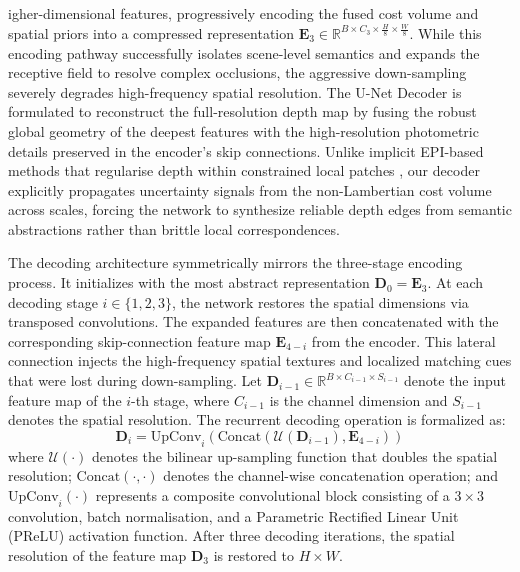 \documentclass[lettersize,journal]{IEEEtran}
\begin{document}
igher-dimensional features, progressively encoding the fused cost volume and spatial priors into a compressed representation $\mathbf{E}_3 \in \mathbb{R}^{B \times C_3 \times \frac{H}{8} \times \frac{W}{8}}$. While this encoding pathway successfully isolates scene-level semantics and expands the receptive field to resolve complex occlusions, the aggressive down-sampling severely degrades high-frequency spatial resolution. The U-Net Decoder is formulated to reconstruct the full-resolution depth map by fusing the robust global geometry of the deepest features with the high-resolution photometric details preserved in the encoder's skip connections. Unlike implicit EPI-based methods that regularise depth within constrained local patches \cite{heber2018}, our decoder explicitly propagates uncertainty signals from the non-Lambertian cost volume across scales, forcing the network to synthesize reliable depth edges from semantic abstractions rather than brittle local correspondences.

The decoding architecture symmetrically mirrors the three-stage encoding process. It initializes with the most abstract representation $\mathbf{D}_0 = \mathbf{E}_3$. At each decoding stage $i \in \{1, 2, 3\}$, the network restores the spatial dimensions via transposed convolutions. The expanded features are then concatenated with the corresponding skip-connection feature map $\mathbf{E}_{4-i}$ from the encoder. This lateral connection injects the high-frequency spatial textures and localized matching cues that were lost during down-sampling. Let $\mathbf{D}_{i-1} \in \mathbb{R}^{B \times C_{i-1} \times S_{i-1}}$ denote the input feature map of the $i$-th stage, where $C_{i-1}$ is the channel dimension and $S_{i-1}$ denotes the spatial resolution. The recurrent decoding operation is formalized as:
\begin{equation}
\mathbf{D}_i = \text{UpConv}_i \left( \text{Concat} \left( \mathcal{U}(\mathbf{D}_{i-1}), \mathbf{E}_{4-i} \right) \right)
\end{equation}
where $\mathcal{U}(\cdot)$ denotes the bilinear up-sampling function that doubles the spatial resolution; $\text{Concat}(\cdot, \cdot)$ denotes the channel-wise concatenation operation; and $\text{UpConv}_i(\cdot)$ represents a composite convolutional block consisting of a $3 \times 3$ convolution, batch normalisation, and a Parametric Rectified Linear Unit (PReLU) activation function. After three decoding iterations, the spatial resolution of the feature map $\mathbf{D}_3$ is restored to $H \times W$.
\end{document}
